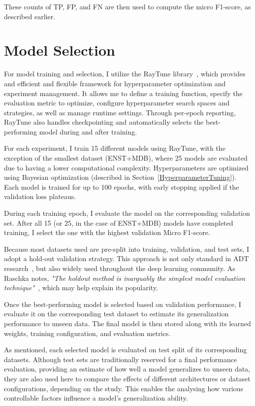 These counts of \acrshort{TP}, \acrshort{FP}, and \acrshort{FN} are then used to compute the micro F1-score, as described earlier.

\section{Model Selection}

For model training and selection, I utilize the RayTune library~\cite{liaw2018tuneresearchplatformdistributed}, which provides and efficient and flexible framework for hyperparameter optimization and experiment management. It allows me to define a training function, specify the evaluation metric to optimize, configure hyperparameter search spaces and strategies, as well as manage runtime settings. Through per-epoch reporting, RayTune also handles checkpointing and automatically selects the best-performing model during and after training.

For each experiment, I train 15 different models using RayTune, with the exception of the smallest dataset (ENST+MDB), where 25 models are evaluated due to having a lower computational complexity. Hyperparameters are optimized using Bayesian optimization (described in Section~\ref{HyperparameterTuning}). Each model is trained for up to 100 epochs, with early stopping applied if the validation loss plateaus. 

During each training epoch, I evaluate the model on the corresponding validation set. After all 15 (or 25, in the case of ENST+MDB) models have completed training, I select the one with the highest validation Micro F1-score. 

Because most datasets used are pre-split into training, validation, and test sets, I adopt a hold-out validation strategy. This approach is not only standard in \gls{ADT} research~\cite{vogl2016recurrent, 8350302, chang2024yourmt3+}, but also widely used throughout the deep learning community. As Raschka notes, \textit{"The holdout method is inarguably the simplest model evaluation technique"}~\cite{raschka2020modelevaluationmodelselection}, which may help explain its popularity.

Once the best-performing model is selected based on validation performance, I evaluate it on the corresponding test dataset to estimate its generalization performance to unseen data. The final model is then stored along with its learned weights, training configuration, and evaluation metrics.

As mentioned, each selected model is evaluated on test split of its corresponding datasets. Although test sets are traditionally reserved for a final performance evaluation, providing an estimate of how well a model generalizes to unseen data, they are also used here to compare the effects of different architectures or dataset configurations, depending on the study. This enables the analysing how various controllable factors influence a model's generalization ability. 

